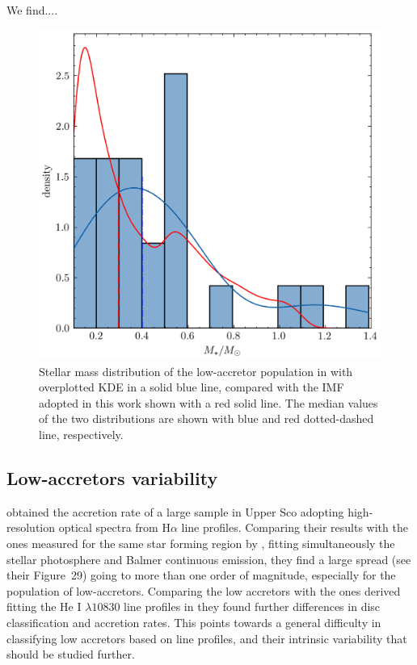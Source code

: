 \documentclass[fleqn,usenatbib,letters]{mnras}
\begin{document}
We find.... 
\begin{figure}
    \includegraphics[width=0.92\columnwidth]{Mstar_comparison.png}
    \caption{Stellar mass distribution of the low-accretor population in \citet{Thanathibodee2023} with overplotted KDE in a solid blue line, compared with the IMF adopted in this work shown with a red solid line. The median values of the two distributions are shown with blue and red dotted-dashed line, respectively.  \label{fig:mstar_comparison}}
\end{figure}

\subsection{Low-accretors variability}

\citet{Fang2023} obtained the accretion rate of a large sample in Upper Sco adopting high-resolution optical spectra from H$\alpha$ line profiles. Comparing their results with the ones measured for the same star forming region by \citet{Manara2020}, fitting simultaneously the stellar photosphere and Balmer continuous emission, they find a large spread (see their Figure~29) going to more than one order of magnitude, especially for the population of low-accretors. Comparing the low accretors with the ones derived fitting the He I $\lambda10830$ line profiles in \citet{Thanathibodee2023} they found further differences in disc classification and accretion rates. This points towards a general difficulty in classifying low accretors based on line profiles, and their intrinsic variability that should be studied further.
\end{document}
